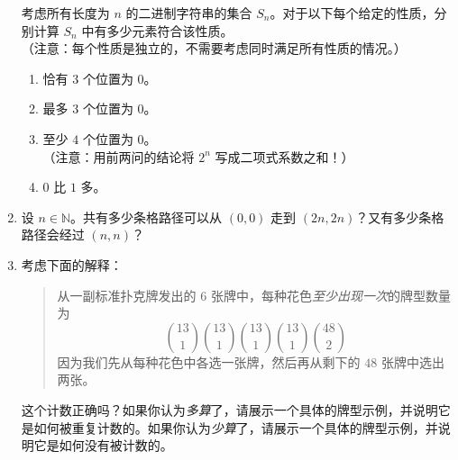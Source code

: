 \begin{enumerate}[label=(\arabic*)]
          考虑所有长度为 $n$ 的二进制字符串的集合 $S_n$。对于以下每个给定的性质，分别计算 $S_n$ 中有多少元素符合该性质。\\
          （注意：每个性质是独立的，不需要考虑同时满足所有性质的情况。）
          \begin{enumerate}[label=(\alph*)]
              \item 恰有 $3$ 个位置为 $0$。
              \item 最多 $3$ 个位置为 $0$。
              \item 至少 $4$ 个位置为 $0$。\\
                    （注意：用前两问的结论将 $2^n$ 写成二项式系数之和！）
              \item $0$ 比 $1$ 多。
          \end{enumerate}
    \item 设 $n \in \mathbb{N}$。共有多少条格路径可以从 $(0, 0)$ 走到 $(2n, 2n)$？又有多少条格路径会经过 $(n, n)$？
    \item 考虑下面的解释：
          \begin{quote}
              从一副标准扑克牌发出的 $6$ 张牌中，每种花色\emph{至少出现一次}的牌型数量为
              \[{13 \choose 1}{13 \choose 1}{13 \choose 1}{13 \choose 1}{48 \choose 2}\]
              因为我们先从每种花色中各选一张牌，然后再从剩下的 $48$ 张牌中选出两张。
          \end{quote}
          这个计数正确吗？如果你认为\emph{多算}了，请展示一个具体的牌型示例，并说明它是如何被重复计数的。如果你认为\emph{少算}了，请展示一个具体的牌型示例，并说明它是如何没有被计数的。
\end{enumerate}